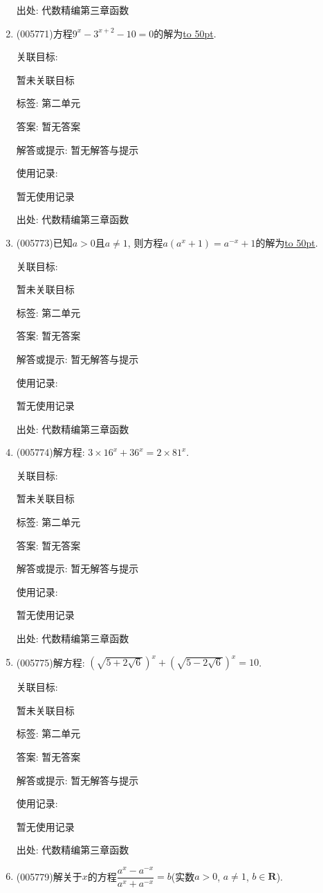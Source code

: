 \documentclass[10pt,a4paper]{article}
\newcommand{\blank}[1]{\underline{\hbox to #1pt{}}}
\begin{document}
\begin{enumerate}[1.]
出处: 代数精编第三章函数
\item { (005771)}方程$9^x-3^{x+2}-10=0$的解为\blank{50}.


关联目标:

暂未关联目标



标签: 第二单元

答案: 暂无答案

解答或提示: 暂无解答与提示

使用记录:

暂无使用记录


出处: 代数精编第三章函数
\item { (005773)}已知$a>0$且$a\ne 1$, 则方程$a(a^x+1)=a^{-x}+1$的解为\blank{50}.


关联目标:

暂未关联目标



标签: 第二单元

答案: 暂无答案

解答或提示: 暂无解答与提示

使用记录:

暂无使用记录


出处: 代数精编第三章函数
\item { (005774)}解方程: $3\times 16^x+36^x=2\times 81^x$.


关联目标:

暂未关联目标



标签: 第二单元

答案: 暂无答案

解答或提示: 暂无解答与提示

使用记录:

暂无使用记录


出处: 代数精编第三章函数
\item { (005775)}解方程: $(\sqrt {5+2\sqrt 6})^x+(\sqrt {5-2\sqrt 6})^x=10$.


关联目标:

暂未关联目标



标签: 第二单元

答案: 暂无答案

解答或提示: 暂无解答与提示

使用记录:

暂无使用记录


出处: 代数精编第三章函数
\item { (005779)}解关于$x$的方程$\dfrac{a^x-a^{-x}}{a^x+a^{-x}}=b$(实数$a>0$, $a\ne 1$, $b\in \mathbf{R}$).



\end{enumerate}
\end{document}
